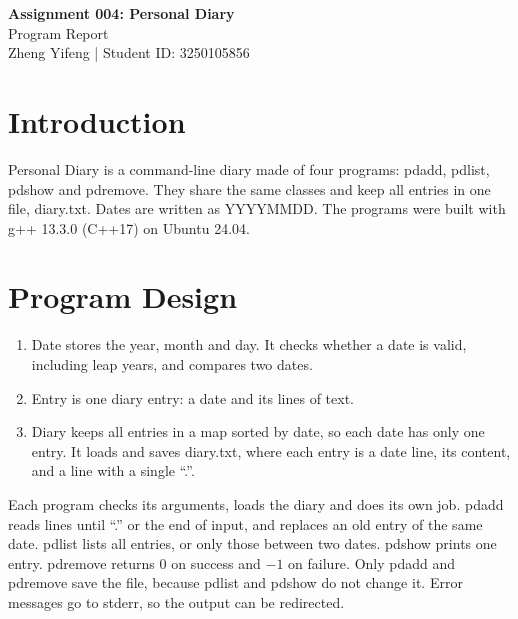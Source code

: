 \documentclass[11pt,a4paper]{article}
\begin{document}
\begin{center}
  {\LARGE\bfseries Assignment 004: Personal Diary}\\[0.6ex]
  {\large Program Report}\\[0.6ex]
  Zheng Yifeng \quad | \quad Student ID: 3250105856
\end{center}

\section{Introduction}

Personal Diary is a command-line diary made of four programs: pdadd, pdlist,
pdshow and pdremove. They share the same classes and keep all entries in one
file, diary.txt. Dates are written as YYYYMMDD. The programs were built with
g++ 13.3.0 (C++17) on Ubuntu 24.04.

\section{Program Design}

\begin{enumerate}
  \item Date stores the year, month and day. It checks whether a date is valid,
        including leap years, and compares two dates.
  \item Entry is one diary entry: a date and its lines of text.
  \item Diary keeps all entries in a map sorted by date, so each date has only
        one entry. It loads and saves diary.txt, where each entry is a date
        line, its content, and a line with a single ``.''.
\end{enumerate}

Each program checks its arguments, loads the diary and does its own job. pdadd
reads lines until ``.'' or the end of input, and replaces an old entry of the
same date. pdlist lists all entries, or only those between two dates. pdshow
prints one entry. pdremove returns 0 on success and $-1$ on failure. Only pdadd
and pdremove save the file, because pdlist and pdshow do not change it. Error
messages go to stderr, so the output can be redirected.
\end{document}
